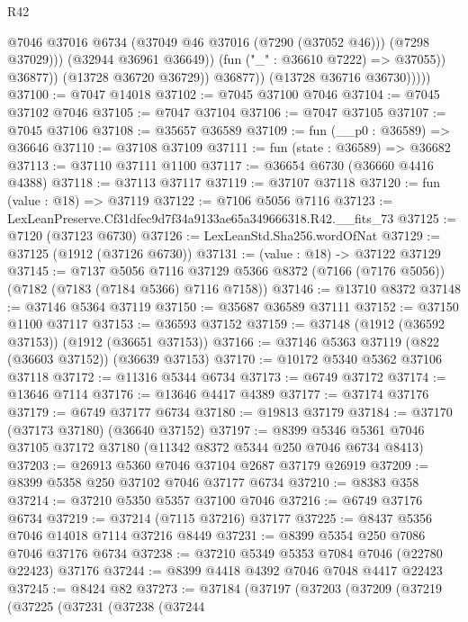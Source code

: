 \begin{lexlean}{R42}
\begin{coremodule}
{                              @7046
                              @37016
                              @6734
                              (@37049 @46 @37016 (@7290 (@37052 @46)))
                              (@7298 @37029)))
                          (@32944 @36961 @36649))
                        (fun ("_" : @36610 @7222) => @37055))
                      @36877))
                  (@13728 @36720 @36729))
                @36877))
            (@13728 @36716 @36730)))))
@37100 := @7047 @14018
@37102 := @7045 @37100 @7046
@37104 := @7045 @37102 @7046
@37105 := @7047 @37104
@37106 := @7047 @37105
@37107 := @7045 @37106
@37108 := @35657 @36589
@37109 := fun (__p0 : @36589) => @36646
@37110 := @37108 @37109
@37111 := fun (state : @36589) => @36682
@37113 := @37110 @37111 @1100
@37117 := @36654 @6730 (@36660 @4416 @4388)
@37118 := @37113 @37117
@37119 := @37107 @37118
@37120 := fun (value : @18) => @37119
@37122 := @7106 @5056 @7116
@37123 := LexLeanPreserve.Cf31dfec9d7f34a9133ae65a349666318.R42.__fits_73
@37125 := @7120 (@37123 @6730)
@37126 := LexLeanStd.Sha256.wordOfNat
@37129 := @37125 (@1912 (@37126 @6730))
@37131 := (value : @18) -> @37122 @37129
@37145 := @7137
    @5056
    @7116
    @37129
    @5366
    @8372
    (@7166 (@7176 @5056))
    (@7182 (@7183 (@7184 @5366) @7116 @7158))
@37146 := @13710 @8372
@37148 := @37146 @5364 @37119
@37150 := @35687 @36589 @37111
@37152 := @37150 @1100 @37117
@37153 := @36593 @37152
@37159 := @37148 (@1912 (@36592 @37153)) (@1912 (@36651 @37153))
@37166 := @37146 @5363 @37119 (@822 (@36603 @37152)) (@36639 @37153)
@37170 := @10172 @5340 @5362 @37106 @37118
@37172 := @11316 @5344 @6734
@37173 := @6749 @37172
@37174 := @13646 @7114
@37176 := @13646 @4417 @4389
@37177 := @37174 @37176
@37179 := @6749 @37177 @6734
@37180 := @19813 @37179
@37184 := @37170 (@37173 @37180) (@36640 @37152)
@37197 := @8399 @5346 @5361 @7046 @37105 @37172 @37180 (@11342 @8372 @5344 @250 @7046 @6734 @8413)
@37203 := @26913 @5360 @7046 @37104 @2687 @37179 @26919
@37209 := @8399 @5358 @250 @37102 @7046 @37177 @6734
@37210 := @8383 @358
@37214 := @37210 @5350 @5357 @37100 @7046
@37216 := @6749 @37176 @6734
@37219 := @37214 (@7115 @37216) @37177
@37225 := @8437 @5356 @7046 @14018 @7114 @37216 @8449
@37231 := @8399 @5354 @250 @7086 @7046 @37176 @6734
@37238 := @37210 @5349 @5353 @7084 @7046 (@22780 @22423) @37176
@37244 := @8399 @4418 @4392 @7046 @7048 @4417 @22423
@37245 := @8424 @82
@37273 := @37184
    (@37197
      (@37203
        (@37209
          (@37219
            (@37225
              (@37231
                (@37238
                  (@37244
}
\end{coremodule}
\end{lexlean}
